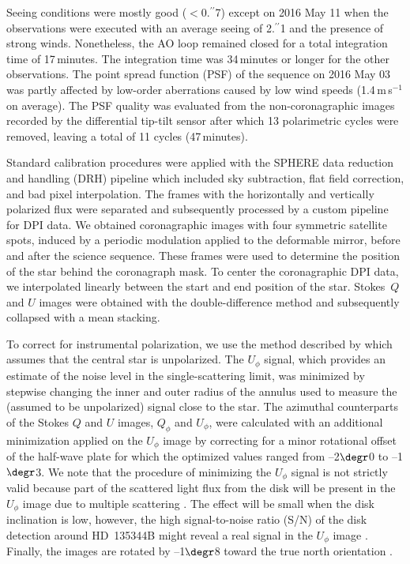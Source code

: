 \documentclass[twocolumn,tighten]{aastex61}
\newcommand{\ffdeg}{\mbox{\ensuremath{.\!\!\degr}}}
\newcommand{\ffarcs}{\mbox{\ensuremath{.\!\!^{\prime\prime}}}}
\begin{document}
Seeing conditions were mostly good ($<$0\ffarcs7) except on 2016 May 11 when the observations were executed with an average seeing of 2\ffarcs1 and the presence of strong winds. Nonetheless, the AO loop remained closed for a total integration time of 17\,minutes. The integration time was 34\,minutes or longer for the other observations. The point spread function (PSF) of the sequence on 2016 May 03 was partly affected by low-order aberrations caused by low wind speeds (1.4\,m\,s$^{-1}$ on average). The PSF quality was evaluated from the non-coronagraphic images recorded by the differential tip-tilt sensor after which 13 polarimetric cycles were removed, leaving a total of 11 cycles (47\,minutes).

Standard calibration procedures were applied with the SPHERE data reduction and handling (DRH) pipeline \citep[v0.18.0;][]{pavlov2008} which included sky subtraction, flat field correction, and bad pixel interpolation. The frames with the horizontally and vertically polarized flux were separated and subsequently processed by a custom pipeline for DPI data. We obtained coronagraphic images with four symmetric satellite spots, induced by a periodic modulation applied to the deformable mirror, before and after the science sequence. These frames were used to determine the position of the star behind the coronagraph mask. To center the coronagraphic DPI data, we interpolated linearly between the start and end position of the star. Stokes~$Q$ and $U$ images were obtained with the double-difference method \citep{hinkley2009} and subsequently collapsed with a mean stacking. 

To correct for instrumental polarization, we use the method described by \citet{canovas2011} which assumes that the central star is unpolarized. The $U_\phi$ signal, which provides an estimate of the noise level in the single-scattering limit, was minimized by stepwise changing the inner and outer radius of the annulus used to measure the (assumed to be unpolarized) signal close to the star. The azimuthal counterparts of the Stokes $Q$ and $U$ images, $Q_\phi$ and $U_\phi$, were calculated with an additional minimization applied on the $U_\phi$ image by correcting for a minor rotational offset of the half-wave plate \citep{avenhaus2014} for which the optimized values ranged from --2\ffdeg0 to --1\ffdeg3. We note that the procedure of minimizing the $U_\phi$ signal is not strictly valid because part of the scattered light flux from the disk will be present in the $U_\phi$ image due to multiple scattering \citep{canovas2015}. The effect will be small when the disk inclination is low, however, the high signal-to-noise ratio (S/N) of the disk detection around HD~135344B might reveal a real signal in the $U_\phi$ image \citep{stolker2016}. Finally, the images are rotated by --1\ffdeg8 toward the true north orientation \citep{maire2016}.
\end{document}
